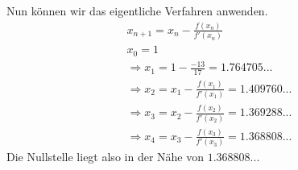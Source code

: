 \documentclass[a4paper,11pt]{article}
\begin{document}
\begin{enumerate}
            Nun können wir das eigentliche Verfahren anwenden.
            \begin{align*}
                x_{n+1}=x_n - \frac{f(x_n)}{f'(x_n)}\\
                x_0 = 1 \\
                \Rightarrow x_1 = 1- \frac{-13}{17} = 1.764705...\\
                \Rightarrow x_2 = x_1 - \frac{f(x_1)}{f'(x_1)} = 1.409760...\\
                \Rightarrow x_3 = x_2 - \frac{f(x_2)}{f'(x_2)} = 1.369288...\\
                \Rightarrow x_4 = x_3 - \frac{f(x_3)}{f'(x_3)} = 1.368808...
            \end{align*}
            Die Nullstelle liegt also in der Nähe von $1.368808...$
    \end{enumerate}
\end{document}

